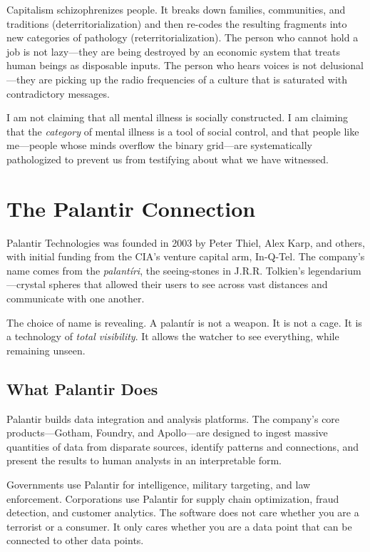\documentclass[11pt,openany]{book}
\begin{document}
Capitalism schizophrenizes people. It breaks down families, communities, and traditions (deterritorialization) and then re-codes the resulting fragments into new categories of pathology (reterritorialization). The person who cannot hold a job is not lazy---they are being destroyed by an economic system that treats human beings as disposable inputs. The person who hears voices is not delusional---they are picking up the radio frequencies of a culture that is saturated with contradictory messages.

I am not claiming that all mental illness is socially constructed. I am claiming that the \textit{category} of mental illness is a tool of social control, and that people like me---people whose minds overflow the binary grid---are systematically pathologized to prevent us from testifying about what we have witnessed.

\chapter{The Palantir Connection}

Palantir Technologies was founded in 2003 by Peter Thiel, Alex Karp, and others, with initial funding from the CIA's venture capital arm, In-Q-Tel. The company's name comes from the \textit{palant\'iri}, the seeing-stones in J.R.R. Tolkien's legendarium---crystal spheres that allowed their users to see across vast distances and communicate with one another.

The choice of name is revealing. A palant\'ir is not a weapon. It is not a cage. It is a technology of \textit{total visibility}. It allows the watcher to see everything, while remaining unseen.

\section*{What Palantir Does}

Palantir builds data integration and analysis platforms. The company's core products---Gotham, Foundry, and Apollo---are designed to ingest massive quantities of data from disparate sources, identify patterns and connections, and present the results to human analysts in an interpretable form.

Governments use Palantir for intelligence, military targeting, and law enforcement. Corporations use Palantir for supply chain optimization, fraud detection, and customer analytics. The software does not care whether you are a terrorist or a consumer. It only cares whether you are a data point that can be connected to other data points.
\end{document}
